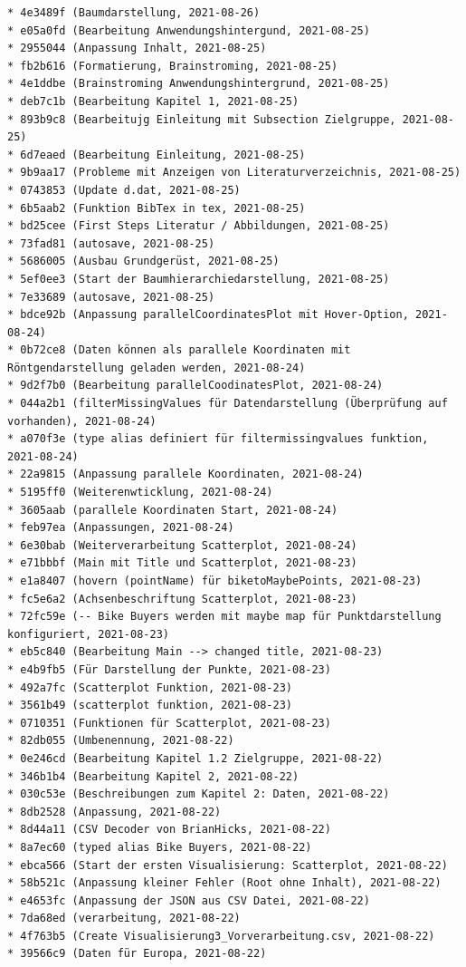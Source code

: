 \documentclass[usegeometry=true]{scrartcl}
\begin{document}
\begin{verbatim}
* 4e3489f (Baumdarstellung, 2021-08-26)
* e05a0fd (Bearbeitung Anwendungshintergund, 2021-08-25)
* 2955044 (Anpassung Inhalt, 2021-08-25)
* fb2b616 (Formatierung, Brainstroming, 2021-08-25)
* 4e1ddbe (Brainstroming Anwendungshintergrund, 2021-08-25)
* deb7c1b (Bearbeitung Kapitel 1, 2021-08-25)
* 893b9c8 (Bearbeitujg Einleitung mit Subsection Zielgruppe, 2021-08-25)
* 6d7eaed (Bearbeitung Einleitung, 2021-08-25)
* 9b9aa17 (Probleme mit Anzeigen von Literaturverzeichnis, 2021-08-25)
* 0743853 (Update d.dat, 2021-08-25)
* 6b5aab2 (Funktion BibTex in tex, 2021-08-25)
* bd25cee (First Steps Literatur / Abbildungen, 2021-08-25)
* 73fad81 (autosave, 2021-08-25)
* 5686005 (Ausbau Grundgerüst, 2021-08-25)
* 5ef0ee3 (Start der Baumhierarchiedarstellung, 2021-08-25)
* 7e33689 (autosave, 2021-08-25)
* bdce92b (Anpassung parallelCoordinatesPlot mit Hover-Option, 2021-08-24)
* 0b72ce8 (Daten können als parallele Koordinaten mit Röntgendarstellung geladen werden, 2021-08-24)
* 9d2f7b0 (Bearbeitung parallelCoodinatesPlot, 2021-08-24)
* 044a2b1 (filterMissingValues für Datendarstellung (Überprüfung auf vorhanden), 2021-08-24)
* a070f3e (type alias definiert für filtermissingvalues funktion, 2021-08-24)
* 22a9815 (Anpassung parallele Koordinaten, 2021-08-24)
* 5195ff0 (Weiterenwticklung, 2021-08-24)
* 3605aab (parallele Koordinaten Start, 2021-08-24)
* feb97ea (Anpassungen, 2021-08-24)
* 6e30bab (Weiterverarbeitung Scatterplot, 2021-08-24)
* e71bbbf (Main mit Title und Scatterplot, 2021-08-23)
* e1a8407 (hovern (pointName) für biketoMaybePoints, 2021-08-23)
* fc5e6a2 (Achsenbeschriftung Scatterplot, 2021-08-23)
* 72fc59e (-- Bike Buyers werden mit maybe map für Punktdarstellung konfiguriert, 2021-08-23)
* eb5c840 (Bearbeitung Main --> changed title, 2021-08-23)
* e4b9fb5 (Für Darstellung der Punkte, 2021-08-23)
* 492a7fc (Scatterplot Funktion, 2021-08-23)
* 3561b49 (scatterplot funktion, 2021-08-23)
* 0710351 (Funktionen für Scatterplot, 2021-08-23)
* 82db055 (Umbenennung, 2021-08-22)
* 0e246cd (Bearbeitung Kapitel 1.2 Zielgruppe, 2021-08-22)
* 346b1b4 (Bearbeitung Kapitel 2, 2021-08-22)
* 030c53e (Beschreibungen zum Kapitel 2: Daten, 2021-08-22)
* 8db2528 (Anpassung, 2021-08-22)
* 8d44a11 (CSV Decoder von BrianHicks, 2021-08-22)
* 8a7ec60 (typed alias Bike Buyers, 2021-08-22)
* ebca566 (Start der ersten Visualisierung: Scatterplot, 2021-08-22)
* 58b521c (Anpassung kleiner Fehler (Root ohne Inhalt), 2021-08-22)
* e4653fc (Anpassung der JSON aus CSV Datei, 2021-08-22)
* 7da68ed (verarbeitung, 2021-08-22)
* 4f763b5 (Create Visualisierung3_Vorverarbeitung.csv, 2021-08-22)
* 39566c9 (Daten für Europa, 2021-08-22)

\end{verbatim}
\end{document}
